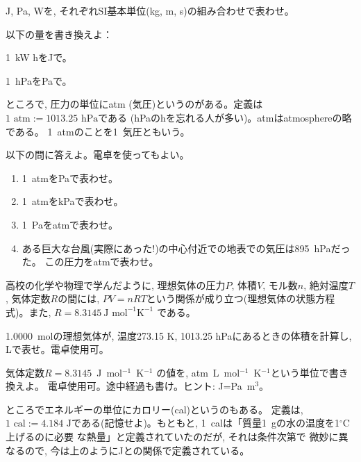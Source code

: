 \begin{q}\label{q:unit_NJPaW_matome1} J, Pa, Wを, 
それぞれSI基本単位(kg, m, s)の組み合わせで表わせ。\end{q}

\begin{q}\label{q:kWh2J_hPa2Pa} 以下の量を書き換えよ：
\begin{edaenumerate}
\item 1~kW hをJで。
\item 1~hPaをPaで。
\end{edaenumerate}
\end{q}
\mv

ところで, 圧力の単位にatm (気圧)というのがある。定義は
$1\text{ atm} :=1013.25\text{ hPa}$である
(hPaのhを忘れる人が多い)。atmはatmosphereの略である。
1~atmのことを1~気圧ともいう。

\begin{q}\label{q:unit_atm_Pa_conversion} 以下の問に答えよ。電卓を使ってもよい。
\begin{enumerate}
\item 1~atmをPaで表わせ。
\item 1~atmをkPaで表わせ。
\item 1~Paをatmで表わせ。
\item ある巨大な台風(実際にあった!)の中心付近での地表での気圧は895~hPaだった。
この圧力をatmで表わせ。
\end{enumerate}
\end{q}

高校の化学や物理で学んだように, 理想気体の圧力$P$, 体積$V$, 
モル数$n$, 絶対温度$T$, 気体定数$R$の間には, 
$PV=nRT$という関係が成り立つ(理想気体の状態方程式)。また, $R=8.3145~\text{J~mol}^{-1}\text{K}^{-1}$
である。

\begin{q}\label{q:PVnRT} 1.0000~molの理想気体が, 温度273.15 K, 
1013.25 hPaにあるときの体積を計算し, Lで表せ。電卓使用可。\end{q}

\begin{q}\label{q:gas_const_conversion} 気体定数$R=8.3145$~J~mol$^{-1}$~K$^{-1}$
の値を, atm~L~mol$^{-1}$~K$^{-1}$という単位で書き換えよ。
電卓使用可。途中経過も書け。ヒント: J=Pa~m$^3$。\end{q}

ところでエネルギーの単位にカロリー(cal)というのもある。
定義は, $1\text{~cal}:=4.184\text{~J}$である(記憶せよ)。もともと, 
1~calは「質量1~gの水の温度を1$^\circ$C上げるのに必要
な熱量」と定義されていたのだが, それは条件次第で
微妙に異なるので, 今は上のようにJとの関係で定義されている。

